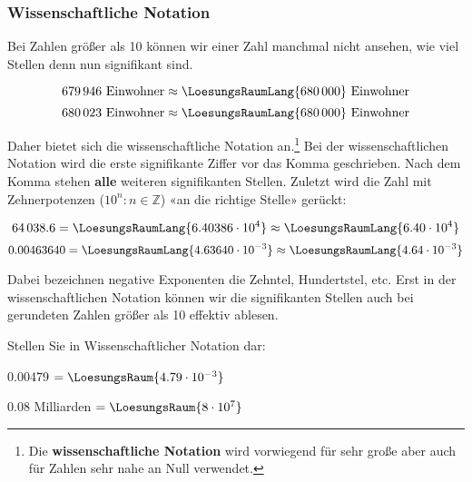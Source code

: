 

\newpage

  
\subsubsection{Wissenschaftliche Notation}\label{wissenschaftlicheNotation}
Bei Zahlen größer als 10 können wir einer Zahl manchmal nicht ansehen, wie viel Stellen denn nun signifikant sind.

$$ 679\,946 \textrm{\ Einwohner} \approx  \LoesungsRaumLang{680\,000} \textrm{\ Einwohner}$$
$$ 680\,023 \textrm{\ Einwohner} \approx  \LoesungsRaumLang{680\,000} \textrm{\ Einwohner}$$

Daher bietet sich die wissenschaftliche Notation an.\footnote{Die
\textbf{wissenschaftliche Notation} wird vorwiegend für sehr große
aber auch für Zahlen sehr nahe an Null verwendet.}
Bei der wissenschaftlichen Notation wird die erste signifikante Ziffer
vor das Komma geschrieben. Nach dem Komma stehen \textbf{alle} weiteren signifikanten Stellen.
Zuletzt wird die Zahl mit Zehnerpotenzen
($10^{n}: n \in \mathbb{Z}$) «an die richtige Stelle» gerückt:

$$64\,038.6  = \LoesungsRaumLang{6.40386 \cdot 10^{ 4}} \approx \LoesungsRaumLang{6.40 \cdot 10^{ 4}}$$
$$0.00463640 = \LoesungsRaumLang{4.63640 \cdot 10^{-3}} \approx \LoesungsRaumLang{4.64 \cdot 10^{-3}}$$

Dabei bezeichnen negative Exponenten die Zehntel, Hundertstel, etc.
Erst in der wissenschaftlichen Notation können wir die signifikanten Stellen auch bei gerundeten Zahlen größer als 10 effektiv ablesen.


Stellen Sie in Wissenschaftlicher Notation dar:

0.00479 $= \LoesungsRaum{4.79 \cdot{}10^{-3}}$

0.08 Milliarden $= \LoesungsRaum{8\cdot{}10^7}$



\newpage

